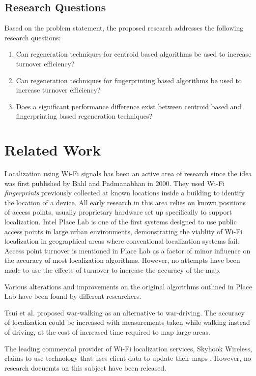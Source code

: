 \documentclass{sig-alternate-br}
\begin{document}
\subsection{Research Questions}
Based on the problem statement, the proposed research addresses the following research questions:
\begin{enumerate}
\item 
Can regeneration techniques for centroid based algorithms be used to increase turnover efficiency?
\item
Can regeneration techniques for fingerprinting based algorithms be used to increase turnover efficiency?
\item
Does a significant performance difference exist between centroid based and fingerprinting based regeneration techniques?
\end{enumerate}

\section{Related Work}
Localization using Wi-Fi signals has been an active area of research since the idea was first published by Bahl and Padmanabhan \cite{bahl:radar} in 2000. They used Wi-Fi \textit{fingerprints} previously collected at known locations inside a building to identify the location of a device. All early research in this area relies on known positions of access points, usually proprietary hardware set up specifically to support localization. Intel Place Lab \cite{cheng:metropolitan-scale} is one of the first systems designed to use public access points in large urban environments, demonstrating the viablity of Wi-Fi localization in geographical areas where conventional localization systems fail. Access point turnover is mentioned in Place Lab as a factor of minor influence on the accuracy of most localization algorithms. However, no attempts have been made to use the effects of turnover to increase the accuracy of the map.

Various alterations and improvements on the original algorithms outlined in Place Lab have been found by different researchers. 

Tsui et al. \cite{tsui:war-walking} proposed war-walking as an alternative to war-driving. The accuracy of localization could be increased with measurements taken while walking instead of driving, at the cost of increased time required to map large areas.

The leading commercial provider of Wi-Fi localization services, Skyhook Wireless, claims to use technology that uses client data to update their maps \cite{skyhook:self-healing}. However, no research docuemts on this subject have been released.
\end{document}
